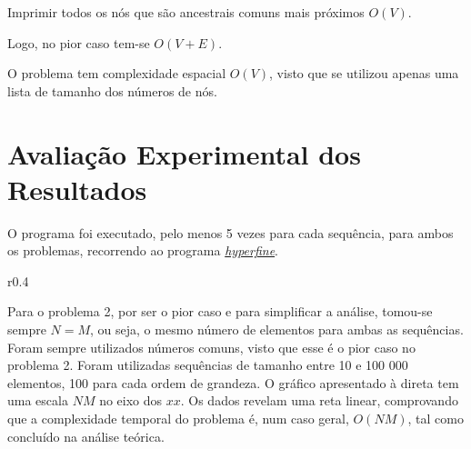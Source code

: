 \documentclass[12pt,a4paper]{article}
\begin{document}
  Imprimir todos os nós que são ancestrais comuns mais próximos $O(V)$.
  
  Logo, no pior caso tem-se $O(V + E)$.

O problema tem complexidade espacial $O(V)$, visto que se utilizou apenas uma lista de tamanho dos números de nós.

  \section{Avaliação Experimental dos Resultados}

  O programa foi executado, pelo menos 5 vezes para cada sequência, para ambos os problemas, recorrendo ao programa \href{https://github.com/sharkdp/hyperfine}{\textit{hyperfine}}.

  \begin{wrapfigure}{r}{0.4\textwidth}
    \centering
    
  \end{wrapfigure}

  Para o problema 2, por ser o pior caso e para simplificar a análise, tomou-se sempre $N = M$, ou seja, o mesmo número de elementos para ambas as sequências.
  Foram sempre utilizados números comuns, visto que esse é o pior caso no problema 2.
  Foram utilizadas sequências de tamanho entre 10 e 100 000 elementos, 100 para cada ordem de grandeza.
  O gráfico apresentado à direta tem uma escala $NM$ no eixo dos $xx$.
  Os dados revelam uma reta linear, comprovando que a complexidade temporal do problema é, num caso geral, $O(NM)$, tal como concluído na análise teórica.
\end{document}
